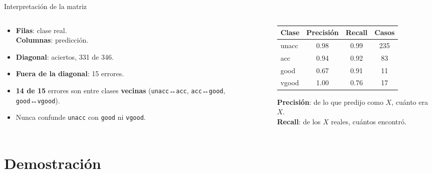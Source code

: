 \documentclass[10pt,aspectratio=169]{beamer}
\begin{document}
\begin{frame}{Interpretación de la matriz}
  \begin{columns}[c]
    \begin{column}{0.44\textwidth}
      \small
      \begin{itemize}
        \setlength{\itemsep}{0.6em}
        \item \textbf{Filas}: clase real.\\ \textbf{Columnas}: predicción.
        \item \textbf{Diagonal}: aciertos, \alert{331 de 346}.
        \item \textbf{Fuera de la diagonal}: 15 errores.
        \item \textbf{14 de 15} errores son entre clases \textbf{vecinas}
              (\texttt{unacc}↔\texttt{acc}, \texttt{acc}↔\texttt{good},
              \texttt{good}↔\texttt{vgood}).
        \item Nunca confunde \texttt{unacc} con \texttt{good} ni \texttt{vgood}.
      \end{itemize}
    \end{column}
    \begin{column}{0.52\textwidth}
      \begin{ventana}[halign=center]
        \small
        \renewcommand{\arraystretch}{1.2}
        \begin{tabular}{lccc}
          \textbf{Clase} & \textbf{Precisión} & \textbf{Recall} & \textbf{Casos} \\
          \midrule
          unacc & 0.98 & 0.99 & 235 \\
          acc   & 0.94 & 0.92 &  83 \\
          good  & 0.67 & 0.91 &  11 \\
          vgood & 1.00 & 0.76 &  17 \\
        \end{tabular}
      \end{ventana}
      \scriptsize
      \textbf{Precisión}: de lo que predijo como $X$, cuánto era $X$.\\
      \textbf{Recall}: de los $X$ reales, cuántos encontró.
    \end{column}
  \end{columns}
\end{frame}

\section{Demostración}
\end{document}
